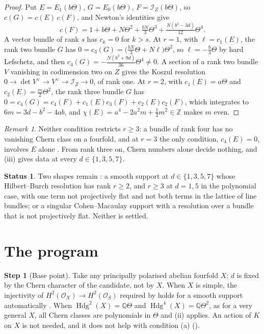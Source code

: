\documentclass[11pt]{amsart}
\theoremstyle{definition}
\newtheorem{step}[theorem]{Step}
\newtheorem{status}[theorem]{Status}
\theoremstyle{remark}
\newtheorem{remark}[theorem]{Remark}
\newcommand{\QQ}{\mathbb{Q}}
\newcommand{\ZZ}{\mathbb{Z}}
\newcommand{\cO}{\mathcal{O}}
\newcommand{\cI}{\mathcal{I}}
\newcommand{\Hdg}{\operatorname{Hdg}}
\begin{document}
\begin{proof}
Put $E=E_{1}(b\Theta)$, $G=E_{0}(b\Theta)$, $F=\cI_{Z}(b\Theta)$, so
$c(G)=c(E)\,c(F)$, and Newton's identities give
\[
  c(F)=1+b\Theta+N\Theta^{2}+\tfrac{bN}{3}\Theta^{3}
  +\tfrac{N(b^{2}-3d)}{12}\Theta^{4}.
\]
A vector bundle of rank $s$ has $c_{k}=0$ for $k>s$. At $r=1$, with
$\ell=c_{1}(E)$, the rank two bundle $G$ has
$0=c_{3}(G)=\bigl(\tfrac{bN}{3}\Theta+N\ell\bigr)\Theta^{2}$, so
$\ell=-\tfrac b3\Theta$ by hard Lefschetz, and then
$c_{4}(G)=-\tfrac{N(b^{2}+9d)}{36}\Theta^{4}\ne0$. A section of a rank two
bundle $V$ vanishing in codimension two on $Z$ gives the Koszul resolution
$0\to\det V^{\vee}\to V^{\vee}\to\cI_{Z}\to0$, of rank one. At $r=2$, with
$c_{1}(E)=a\Theta$ and $c_{2}(E)=\tfrac m2\Theta^{2}$, the rank three bundle
$G$ has $0=c_{4}(G)=c_{4}(F)+c_{1}(E)c_{3}(F)+c_{2}(E)c_{2}(F)$, which
integrates to $6m=3d-b^{2}-4ab$, and
$\chi(E)=a^{4}-2a^{2}m+\tfrac12m^{2}\in\ZZ$ makes $m$ even.
\end{proof}

\begin{remark}\label{rem:ranks}
Neither condition restricts $r\ge3$: a bundle of rank four has no vanishing
Chern class on a fourfold, and at $r=3$ the only condition, $c_{4}(E)=0$,
involves $E$ alone \cite[Remark~18.61]{BMB}. From rank three on, Chern
numbers alone decide nothing, and (iii) gives data at every
$d\in\{1,3,5,7\}$.
\end{remark}

\begin{status}\label{st:remaining}
Two shapes remain \cite[Remark~18.69]{BMB}: a smooth support at
$d\in\{1,3,5,7\}$ whose Hilbert--Burch resolution has rank $r\ge2$, and
$r\ge3$ at $d=1,5$ in the polynomial case, with one term not projectively
flat and not both terms in the lattice of line bundles; or a singular
Cohen--Macaulay support with a resolution over a bundle that is not
projectively flat. Neither is settled.
\end{status}

\section{The program}\label{sec:program}

\begin{step}[Base point]\label{step:base}
Take any principally polarised abelian fourfold $X$; $d$ is fixed by the
Chern character of the candidate, not by $X$. When $X$ is simple, the
injectivity of $H^{2}(\cO_{X})\to H^{2}(\cO_{S})$ required by
\cite[Lemma~18.62]{BMB} holds for a smooth support automatically
\cite[Lemma~18.43]{BMB}. When $\Hdg^{2}(X)=\QQ\Theta$ and
$\Hdg^{4}(X)=\QQ\Theta^{2}$, as for a very general $X$, all Chern classes are
polynomials in $\Theta$ and (ii) applies. An action of
$K$ on $X$ is not needed, and it does not help with condition (a)
().
\end{step}
\end{document}
